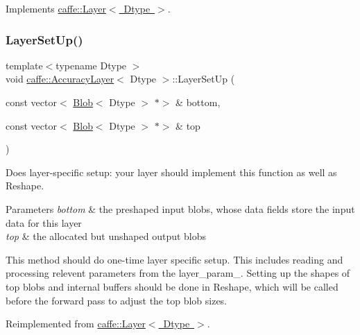 Implements \mbox{\hyperlink{classcaffe_1_1_layer_a576ac6a60b1e99fe383831f52a6cea77}{caffe\+::\+Layer$<$ Dtype $>$}}.

\mbox{\label{classcaffe_1_1_accuracy_layer_a1f2447583c670d92ff6e2c8d53fb4dd9}} 
\subsubsection{\texorpdfstring{Layer\+Set\+Up()}{LayerSetUp()}\hspace{0.1cm}{\footnotesize\ttfamily [1/2]}}
{\footnotesize\ttfamily template$<$typename Dtype $>$ \\
void \mbox{\hyperlink{classcaffe_1_1_accuracy_layer}{caffe\+::\+Accuracy\+Layer}}$<$ Dtype $>$\+::Layer\+Set\+Up (\begin{DoxyParamCaption}\item[{const vector$<$ \mbox{\hyperlink{classcaffe_1_1_blob}{Blob}}$<$ Dtype $>$ $\ast$$>$ \&}]{bottom,  }\item[{const vector$<$ \mbox{\hyperlink{classcaffe_1_1_blob}{Blob}}$<$ Dtype $>$ $\ast$$>$ \&}]{top }\end{DoxyParamCaption})\hspace{0.3cm}{\ttfamily [virtual]}}



Does layer-\/specific setup\+: your layer should implement this function as well as Reshape. 


\begin{DoxyParams}{Parameters}
{\em bottom} & the preshaped input blobs, whose data fields store the input data for this layer \\
\hline
{\em top} & the allocated but unshaped output blobs\\
\hline
\end{DoxyParams}
This method should do one-\/time layer specific setup. This includes reading and processing relevent parameters from the {\ttfamily layer\+\_\+param\+\_\+}. Setting up the shapes of top blobs and internal buffers should be done in {\ttfamily Reshape}, which will be called before the forward pass to adjust the top blob sizes. 

Reimplemented from \mbox{\hyperlink{classcaffe_1_1_layer_a481323a3e0972c682787f2137468c29f}{caffe\+::\+Layer$<$ Dtype $>$}}.

